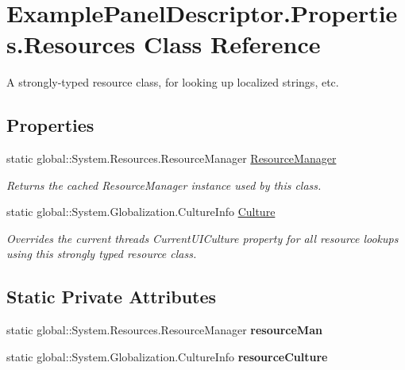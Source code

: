 \hypertarget{class_example_panel_descriptor_1_1_properties_1_1_resources}{}\section{Example\+Panel\+Descriptor.\+Properties.\+Resources Class Reference}
\label{class_example_panel_descriptor_1_1_properties_1_1_resources}


A strongly-\/typed resource class, for looking up localized strings, etc.  


\subsection*{Properties}
\begin{DoxyCompactItemize}
\item 
static global\+::\+System.\+Resources.\+Resource\+Manager \mbox{\hyperlink{class_example_panel_descriptor_1_1_properties_1_1_resources_a49aedc8fd5f931222b5b232731eefcdf}{Resource\+Manager}}
\begin{DoxyCompactList}\small\item\em Returns the cached Resource\+Manager instance used by this class. \end{DoxyCompactList}\item 
static global\+::\+System.\+Globalization.\+Culture\+Info \mbox{\hyperlink{class_example_panel_descriptor_1_1_properties_1_1_resources_a83e5a240f83a5fb65746049ec876cbb6}{Culture}}
\begin{DoxyCompactList}\small\item\em Overrides the current thread\textquotesingle{}s Current\+U\+I\+Culture property for all resource lookups using this strongly typed resource class. \end{DoxyCompactList}\end{DoxyCompactItemize}
\subsection*{Static Private Attributes}
\begin{DoxyCompactItemize}
\item 
\mbox{\label{class_example_panel_descriptor_1_1_properties_1_1_resources_a06e3a2489426eb6b164b66019281cc73}} 
static global\+::\+System.\+Resources.\+Resource\+Manager {\bfseries resource\+Man}
\item 
\mbox{\label{class_example_panel_descriptor_1_1_properties_1_1_resources_aec55c81bed3cb0d8391170a5016baa67}} 
static global\+::\+System.\+Globalization.\+Culture\+Info {\bfseries resource\+Culture}
\end{DoxyCompactItemize}


